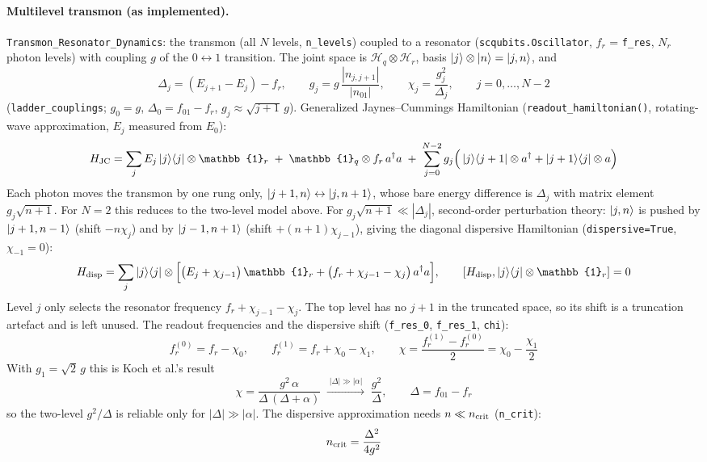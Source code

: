 \documentclass[11pt]{article}
\newcommand{\ad}{a^{\dagger}}
\newcommand{\id}{\mathbb{1}}
\begin{document}
\paragraph{Multilevel transmon (as implemented).}
\texttt{Transmon\_Resonator\_Dynamics}: the transmon (all $N$ levels, \texttt{n\_levels}) coupled
to a resonator (\texttt{scqubits.Oscillator}, $f_r$ = \texttt{f\_res}, $N_r$ photon levels) with
coupling $g$ of the $0\leftrightarrow1$ transition. The joint space is
$\mathcal{H}_q \otimes \mathcal{H}_r$, basis $\ket{j}\otimes\ket{n} = \ket{j,n}$, and
\begin{equation}
  \Delta_j = (E_{j+1} - E_j) - f_r, \qquad
  g_j = g\,\frac{|n_{j,j+1}|}{|n_{01}|}, \qquad
  \chi_j = \frac{g_j^2}{\Delta_j}, \qquad j = 0,\dots,N-2
\end{equation}
(\texttt{ladder\_couplings}; $g_0 = g$, $\Delta_0 = f_{01} - f_r$, $g_j \approx \sqrt{j+1}\,g$).
Generalized Jaynes--Cummings Hamiltonian (\texttt{readout\_hamiltonian()}, rotating-wave
approximation, $E_j$ measured from $E_0$):
\begin{equation}
  H_{\rm JC} = \sum_{j} E_j \ket{j}\!\bra{j} \otimes \id_r
     \;+\; \id_q \otimes f_r\,\ad a
     \;+\; \sum_{j=0}^{N-2} g_j\Big(\ket{j}\!\bra{j+1} \otimes \ad + \ket{j+1}\!\bra{j} \otimes a\Big)
\end{equation}
Each photon moves the transmon by one rung only, $\ket{j+1,n} \leftrightarrow \ket{j,n+1}$, whose
bare energy difference is $\Delta_j$ with matrix element $g_j\sqrt{n+1}$. For $N = 2$ this
reduces to the two-level model above. For $g_j\sqrt{n+1}\ll|\Delta_j|$, second-order perturbation theory: $\ket{j,n}$ is pushed by
$\ket{j+1,n-1}$ (shift $-n\chi_j$) and by $\ket{j-1,n+1}$ (shift $+(n+1)\chi_{j-1}$), giving the
diagonal dispersive Hamiltonian (\texttt{dispersive=True}, $\chi_{-1} = 0$):
\begin{equation}
  H_{\rm disp} = \sum_{j} \ket{j}\!\bra{j} \otimes
    \Big[\big(E_j + \chi_{j-1}\big)\,\id_r + \big(f_r + \chi_{j-1} - \chi_j\big)\,\ad a\Big],
  \qquad [H_{\rm disp}, \ket{j}\!\bra{j}\otimes\id_r] = 0
\end{equation}
Level $j$ only selects the resonator frequency $f_r + \chi_{j-1} - \chi_j$. The top level has no
$j+1$ in the truncated space, so its shift is a truncation artefact and is left unused. The
readout frequencies and the dispersive shift (\texttt{f\_res\_0}, \texttt{f\_res\_1}, \texttt{chi}):
\begin{equation}
  f_r^{(0)} = f_r - \chi_0, \qquad f_r^{(1)} = f_r + \chi_0 - \chi_1, \qquad
  \chi = \frac{f_r^{(1)} - f_r^{(0)}}{2} = \chi_0 - \frac{\chi_1}{2}
\end{equation}
With $g_1 = \sqrt2\,g$ this is Koch et al.'s result
\begin{equation}
  \chi = \frac{g^2\,\alpha}{\Delta\,(\Delta + \alpha)}
  \;\xrightarrow{\;|\Delta| \gg |\alpha|\;}\; \frac{g^2}{\Delta}, \qquad \Delta = f_{01} - f_r
\end{equation}
so the two-level $g^2/\Delta$ is reliable only for $|\Delta|\gg|\alpha|$. The dispersive
approximation needs $n \ll n_{\rm crit}$ (\texttt{n\_crit}):
\begin{equation}
  n_{\rm crit} = \frac{\Delta^2}{4g^2}
\end{equation}
\end{document}
